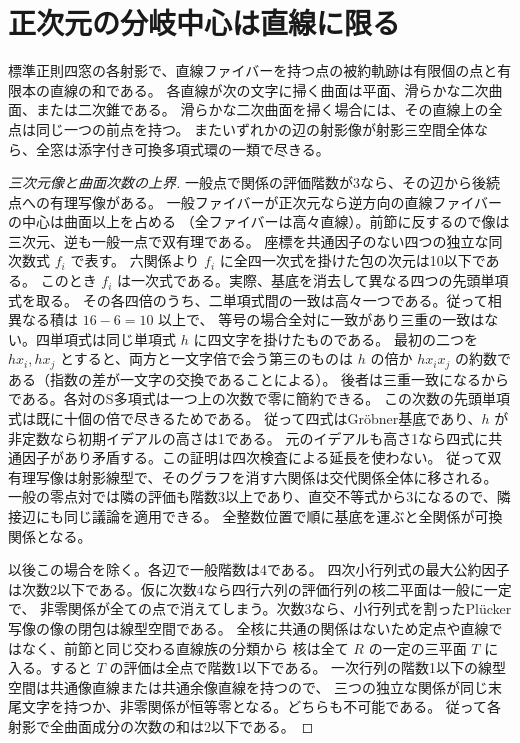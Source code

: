 \section{正次元の分岐中心は直線に限る}
\label{sec:branching-lines-only}
\begin{theorem}\label{thm:branching-lines-only}
標準正則四窓の各射影で、直線ファイバーを持つ点の被約軌跡は有限個の点と有限本の直線の和である。
各直線が次の文字に掃く曲面は平面、滑らかな二次曲面、または二次錐である。
滑らかな二次曲面を掃く場合には、その直線上の全点は同じ一つの前点を持つ。
またいずれかの辺の射影像が射影三空間全体なら、全窓は添字付き可換多項式環の一類で尽きる。
\end{theorem}
\begin{proof}[三次元像と曲面次数の上界]
一般点で関係の評価階数が3なら、その辺から後続点への有理写像がある。
一般ファイバーが正次元なら逆方向の直線ファイバーの中心は曲面以上を占める
（全ファイバーは高々直線）。前節に反するので像は三次元、逆も一般一点で双有理である。
座標を共通因子のない四つの独立な同次数式 $f_i$ で表す。
六関係より $f_i$ に全四一次式を掛けた包の次元は10以下である。
このとき $f_i$ は一次式である。実際、基底を消去して異なる四つの先頭単項式を取る。
その各四倍のうち、二単項式間の一致は高々一つである。従って相異なる積は $16-6=10$ 以上で、
等号の場合全対に一致があり三重の一致はない。四単項式は同じ単項式 $h$ に四文字を掛けたものである。
最初の二つを $h x_i,h x_j$ とすると、両方と一文字倍で会う第三のものは
$h$ の倍か $h x_i x_j$ の約数である（指数の差が一文字の交換であることによる）。
後者は三重一致になるからである。各対のS多項式は一つ上の次数で零に簡約できる。
この次数の先頭単項式は既に十個の倍で尽きるためである。
従って四式はGröbner基底であり、$h$ が非定数なら初期イデアルの高さは1である。
元のイデアルも高さ1なら四式に共通因子があり矛盾する。この証明は四次検査による延長を使わない。
従って双有理写像は射影線型で、そのグラフを消す六関係は交代関係全体に移される。
一般の零点対では隣の評価も階数3以上であり、直交不等式から3になるので、隣接辺にも同じ議論を適用できる。
全整数位置で順に基底を運ぶと全関係が可換関係となる。

以後この場合を除く。各辺で一般階数は4である。
四次小行列式の最大公約因子は次数2以下である。仮に次数4なら四行六列の評価行列の核二平面は一般に一定で、
非零関係が全ての点で消えてしまう。次数3なら、小行列式を割ったPlücker写像の像の閉包は線型空間である。
全核に共通の関係はないため定点や直線ではなく、前節と同じ交わる直線族の分類から
核は全て $R$ の一定の三平面 $T$ に入る。すると $T$ の評価は全点で階数1以下である。
一次行列の階数1以下の線型空間は共通像直線または共通余像直線を持つので、
三つの独立な関係が同じ末尾文字を持つか、非零関係が恒等零となる。どちらも不可能である。
従って各射影で全曲面成分の次数の和は2以下である。
\end{proof}

